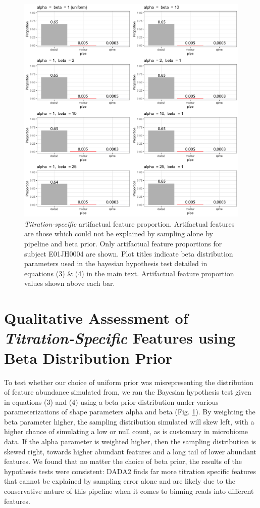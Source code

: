 \documentclass[12pt]{article}
\begin{document}
\clearpage

\begin{figure}
\centering
\includegraphics[width=0.9\linewidth]{beta_bayes_barplots_withprops.png}
\caption{\label{fig:bayesPrior} \emph{Titration-specific} artifactual feature proportion. Artifactual features are those which could not be explained by sampling alone by pipeline and beta prior. Only artifactual feature proportions for subject E01JH0004 are shown. Plot titles indicate beta distribution parameters used in the bayesian hypothesis test detailed in equations (3) \& (4) in the main text. Artifactual feature proportion values shown above each bar. }
\end{figure}

\section*{Qualitative Assessment of \emph{Titration-Specific} Features using Beta Distribution Prior}
To test whether our choice of uniform prior was misrepresenting the distribution of feature abundance simulated from, we ran the Bayesian hypothesis test given in equations (3) and (4) using a beta prior distribution under various parameterizations of shape parameters alpha and beta (Fig. \ref{fig:bayesPrior}). By weighting the beta parameter higher, the sampling distribution simulated will skew left, with a higher chance of simulating a low or null count, as is customary in microbiome data. If the alpha parameter is weighted higher, then the sampling distribution is skewed right, towards higher abundant features and a long tail of lower abundant features. We found that no matter the choice of beta prior, the results of the hypothesis tests were consistent: DADA2 finds far more titration specific features that cannot be explained by sampling error alone and are likely due to the conservative nature of this pipeline when it comes to binning reads into different features.
\end{document}

